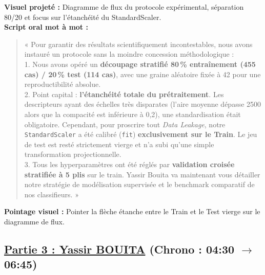\documentclass[a4paper,11pt]{article}
\begin{document}
\begin{tcolorbox}[speechbox, title={Slide 5 : Protocole Expérimental Strict \& Zéro Fuite (03:20 -- 04:30)}]
	\textbf{Visuel projeté :} Diagramme de flux du protocole expérimental, séparation 80/20 et focus sur l'étanchéité du StandardScaler.\\
	\textbf{Script oral mot à mot :}
	\begin{quote}
		« Pour garantir des résultats scientifiquement incontestables, nous avons instauré un protocole sans la moindre concession méthodologique :\\
		1. Nous avons opéré un \textbf{découpage stratifié 80\,\% entraînement (455 cas) / 20\,\% test (114 cas)}, avec une graine aléatoire fixée à 42 pour une reproductibilité absolue.\\
		2. Point capital : \textbf{l'étanchéité totale du prétraitement}. Les descripteurs ayant des échelles très disparates (l'aire moyenne dépasse 2500 alors que la compacité est inférieure à 0,2), une standardisation était obligatoire. Cependant, pour proscrire tout \textit{Data Leakage}, notre \texttt{StandardScaler} a été calibré (\texttt{fit}) \textbf{exclusivement sur le Train}. Le jeu de test est resté strictement vierge et n'a subi qu'une simple transformation projectionnelle.\\
		3. Tous les hyperparamètres ont été réglés par \textbf{validation croisée stratifiée à 5 plis} sur le train. Yassir Bouita va maintenant vous détailler notre stratégie de modélisation supervisée et le benchmark comparatif de nos classifieurs. »
	\end{quote}
	\textbf{Pointage visuel :} Pointer la flèche étanche entre le Train et le Test vierge sur le diagramme de flux.
\end{tcolorbox}

\subsection*{\color{primarygreen}\underline{Partie 3 : Yassir BOUITA} (Chrono : 04:30 $\to$ 06:45)}
\end{document}
